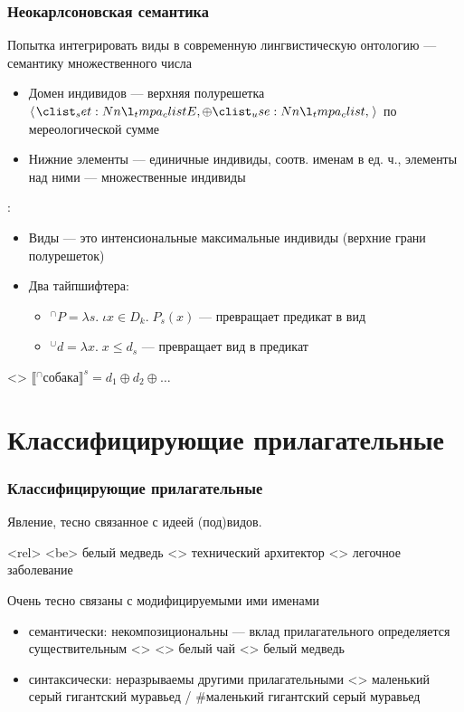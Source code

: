\documentclass[
    9pt,
]{beamer}
\newcommand{\denote}[1]{\llbracket #1 \rrbracket}
\newcommand{\up}{\ensuremath{{}^\cup}}
\newcommand{\down}{\ensuremath{{}^\cap}}
\begin{document}
\begin{frame}
    \frametitle{Неокарлсоновская семантика \parencite{chierchia1998referencekindslanguages}}

    Попытка интегрировать виды в современную лингвистическую онтологию — семантику множественного числа \textcite{link1983logicalanalysisplurals}

    \begin{itemize}
        \item Домен индивидов — верхняя полурешетка $\opair{E, \oplus}$ по мереологической сумме
        \item Нижние элементы — единичные индивиды, соотв. именам в ед. ч., элементы над ними — множественные индивиды
    \end{itemize}

    \textcite{chierchia1998referencekindslanguages}:

    \begin{itemize}
        \item Виды — это интенсиональные максимальные индивиды (верхние грани полурешеток)
        \item Два тайпшифтера:
        \begin{itemize}
            \item $\down P = \lambda s .\; \iota x \in D_k.\; P_s(x)$ — превращает предикат в вид
            \item $\up d = \lambda x.\; x\le d_s$ — превращает вид в предикат
        \end{itemize}
    \end{itemize}

    \ex<>
        $\denote{\down{\text{собака}}}^s = d_1\oplus d_2\oplus \dots$
    \xe
\end{frame}


\section{Классифицирующие прилагательные}

\begin{frame}
    \frametitle{Классифицирующие прилагательные}

    Явление, тесно связанное с идеей (под)видов.

    \pex<rel>
        \a<be> белый медведь
        \a<> технический архитектор
        \a<> легочное заболевание
    \xe

    Очень тесно связаны с модифицируемыми ими именами
    \begin{itemize}
        \item семантически: некомпозициональны — вклад прилагательного определяется существительным
        \pex<>
            \a<> белый чай
            \a<> белый медведь
        \xe
        \item синтаксически: неразрываемы другими прилагательными
        \ex<>
            маленький серый гигантский муравьед / \#маленький гигантский серый муравьед
        \xe
    \end{itemize}

\end{frame}
\end{document}
